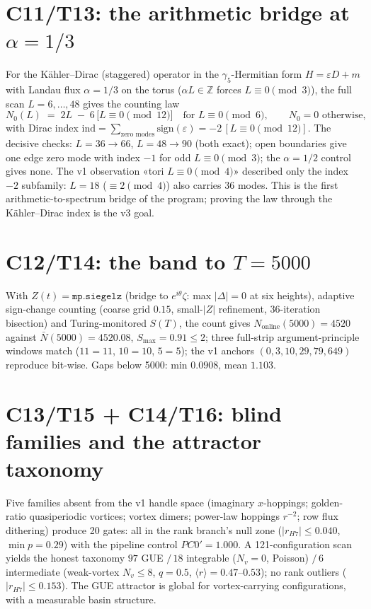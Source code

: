 \documentclass[11pt]{article}
\theoremstyle{definition}
\begin{document}
\section{C11/T13: the arithmetic bridge at $\alpha = 1/3$}
For the K\"ahler--Dirac (staggered) operator in the $\gamma_5$-Hermitian
form $H = \varepsilon D + m$ with Landau flux $\alpha = 1/3$ on the torus
($\alpha L \in \mathbb{Z}$ forces $L \equiv 0 \pmod 3$), the full scan
$L = 6,\dots,48$ gives the counting law
\[
N_0(L) \;=\; 2L \;-\; 6\,\big[L \equiv 0 \pmod{12}\big]
\quad\text{for } L \equiv 0 \pmod 6, \qquad N_0 = 0 \text{ otherwise},
\]
with Dirac index $\mathrm{ind} = \sum_{\text{zero modes}}
\mathrm{sign}(\varepsilon) = -2\,[L \equiv 0 \pmod{12}]$. The decisive
checks: $L = 36 \to 66$, $L = 48 \to 90$ (both exact); open boundaries
give one edge zero mode with index $-1$ for odd $L \equiv 0 \pmod 3$; the
$\alpha = 1/2$ control gives none. The v1 observation «tori $L \equiv 0
\pmod 4$» described only the index $-2$ subfamily: $L = 18$ ($\equiv 2
\pmod 4$) also carries $36$ modes. This is the first
arithmetic-to-spectrum bridge of the program; proving the law through the
K\"ahler--Dirac index is the v3 goal.

\section{C12/T14: the band to $T = 5000$}
With $Z(t) = \mathtt{mp.siegelz}$ (bridge to $e^{i\theta}\zeta$: max
$|\Delta| = 0$ at six heights), adaptive sign-change counting (coarse grid
$0.15$, small-$|Z|$ refinement, 36-iteration bisection) and Turing-monitored
$S(T)$, the count gives $N_{\mathrm{online}}(5000) = 4520$ against
$\bar N(5000) = 4520.08$, $S_{\max} = 0.91 \le 2$; three full-strip
argument-principle windows match ($11{=}11$, $10{=}10$, $5{=}5$); the v1
anchors $(0,3,10,29,79,649)$ reproduce bit-wise. Gaps below 5000: min
$0.0908$, mean $1.103$.

\section{C13/T15 + C14/T16: blind families and the attractor taxonomy}
Five families absent from the v1 handle space (imaginary $x$-hoppings;
golden-ratio quasiperiodic vortices; vortex dimers; power-law hoppings
$r^{-2}$; row flux dithering) produce 20 gates: all in the rank branch's
null zone
($|r_{H7}| \le 0.040$, $\min p = 0.29$) with the pipeline control
$PC0' = 1.000$. A 121-configuration scan yields the honest taxonomy
$97$ GUE $/\,18$ integrable ($N_v{=}0$, Poisson) $/\,6$ intermediate
(weak-vortex $N_v \le 8$, $q{=}0.5$, $\langle r\rangle = 0.47$--$0.53$);
no rank outliers ($|r_{H7}| \le 0.153$). The GUE attractor is global for
vortex-carrying configurations, with a measurable basin structure.
\end{document}
